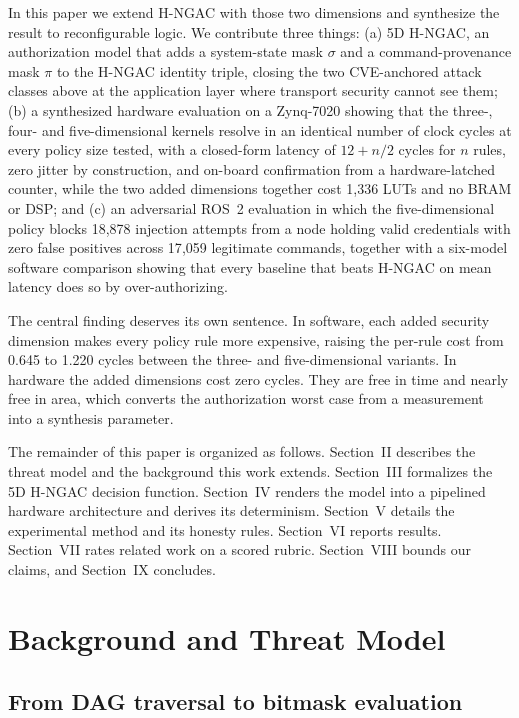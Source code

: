 \documentclass[conference]{IEEEtran}
\newcommand{\new}[1]{\textcolor{hkred}{#1}}
\begin{document}
In this paper we extend H-NGAC with those two dimensions and synthesize the result to reconfigurable logic. We contribute three things: (a) 5D H-NGAC, an authorization model that adds a system-state mask $\sigma$ and a command-provenance mask $\pi$ to the H-NGAC identity triple, closing the two CVE-anchored attack classes above at the application layer where transport security cannot see them; (b) a synthesized hardware evaluation on a Zynq-7020 showing that the \new{three-, }four- and five-dimensional kernels resolve in an identical number of clock cycles at every policy size tested, with a closed-form latency of $12 + n/2$ cycles for $n$ rules, zero jitter by construction, \new{and on-board confirmation from a hardware-latched counter, }while the \new{two added dimensions together cost 1{,}336 LUTs} and no BRAM or DSP; and (c) an adversarial ROS~2 evaluation in which the five-dimensional policy blocks 18{,}878 injection attempts from a node holding valid credentials with zero false positives across 17{,}059 legitimate commands, together with a six-model software comparison showing that every baseline that beats H-NGAC on mean latency does so by over-authorizing.

The central finding deserves its own sentence. In software, each added security dimension makes every policy rule more expensive, raising the per-rule cost from 0.645 to 1.220 cycles between the three- and five-dimensional variants. In hardware the added dimensions cost zero cycles. They are free in time and nearly free in area, which converts the authorization worst case from a measurement into a synthesis parameter.

The remainder of this paper is organized as follows. Section~II describes the threat model and the background this work extends. Section~III formalizes the 5D H-NGAC decision function. Section~IV renders the model into a pipelined hardware architecture and derives its determinism. Section~V details the experimental method and its honesty rules. Section~VI reports results. Section~VII rates related work on a scored rubric. Section~VIII bounds our claims, and Section~IX concludes.

\section{Background and Threat Model}

\subsection{From DAG traversal to bitmask evaluation}
\end{document}
